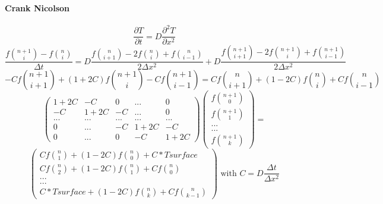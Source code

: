 \documentclass[12pt, a4paper]{report}
\begin{document}
\begin{appendix}
\paragraph{Crank Nicolson}
\begin{equation}\frac{\partial T}{\partial t} = D\frac{\partial^2T }{\partial x^2}
\end{equation} 
\begin{equation}\frac{f\binom{n+1}{i} - f\binom{n}{i}}{\Delta t} = D\frac{f\binom{n}{i+1} - 2f\binom{n}{i}+ f\binom{n}{i-1}}{2\Delta x^{2}}+D\frac{f\binom{n+1}{i+1} - 2f\binom{n+1}{i}+ f\binom{n+1}{i-1}}{2\Delta x^{2}}
\end{equation} 
\begin{equation}-Cf\binom{n+1}{i+1}+(1+2C)f\binom{n+1}{i}-Cf\binom{n+1}{i-1} = Cf\binom{n}{i+1}+(1-2C)f\binom{n}{i}+Cf\binom{n}{i-1}
\end{equation}
\begin{equation}
\begin{pmatrix}
1+2C & -C & 0 & ... & 0\\
-C & 1+2C & -C& ... & 0\\
...&...&...&...&...\\
 0 & ...& -C &1+2C & -C \\
0 & ... &  0& -C & 1+2C
\end{pmatrix}
\begin{pmatrix}
f\binom{n+1}{0}\\
f\binom{n+1}{1}\\
...\\
...\\
f\binom{n+1}{k}
\end{pmatrix}
= 
\end{equation}
\begin{equation}
\begin{pmatrix}
Cf\binom{n}{1}+(1-2C)f\binom{n}{0}+C*Tsurface\\
Cf\binom{n}{2}+(1-2C)f\binom{n}{1}+Cf\binom{n}{0}\\
...\\
...\\
C*Tsurface+(1-2C)f\binom{n}{k}+Cf\binom{n}{k-1}
\end{pmatrix}
   \text{ with }
C = D\frac{\Delta t}{\Delta x^{2}}
\end{equation}

\end{appendix}
\end{document}
